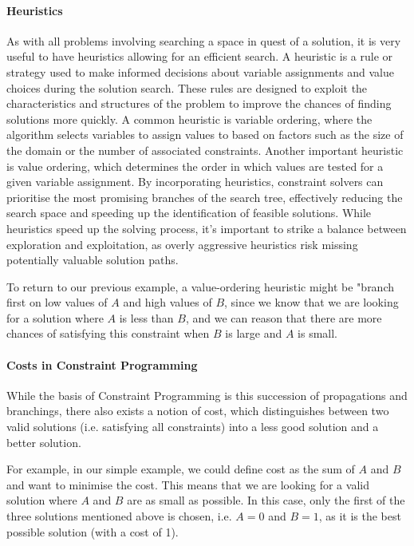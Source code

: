\paragraph{Heuristics}
As with all problems involving searching a space in quest of a solution, it is very useful to have heuristics allowing for an efficient search. A heuristic is a rule or strategy used to make informed decisions about variable assignments and value choices during the solution search. These rules are designed to exploit the characteristics and structures of the problem to improve the chances of finding solutions more quickly. A common heuristic is variable ordering, where the algorithm selects variables to assign values to based on factors such as the size of the domain or the number of associated constraints. Another important heuristic is value ordering, which determines the order in which values are tested for a given variable assignment. By incorporating heuristics, constraint solvers can prioritise the most promising branches of the search tree, effectively reducing the search space and speeding up the identification of feasible solutions. While heuristics speed up the solving process, it's important to strike a balance between exploration and exploitation, as overly aggressive heuristics risk missing potentially valuable solution paths.


To return to our previous example, a value-ordering heuristic might be "branch first on low values of $A$ and high values of $B$, since we know that we are looking for a solution where $A$ is less than $B$, and we can reason that there are more chances of satisfying this constraint when $B$ is large and $A$ is small.

\paragraph{Costs in Constraint Programming}
While the basis of Constraint Programming is this succession of propagations and branchings, there also exists a notion of cost, which distinguishes between two valid solutions (i.e. satisfying all constraints) into a less good solution and a better solution.


For example, in our simple example, we could define cost as the sum of $A$ and $B$ and want to minimise the cost. This means that we are looking for a valid solution where $A$ and $B$ are as small as possible. In this case, only the first of the three solutions mentioned above is chosen, i.e. $A=0$ and $B=1$, as it is the best possible solution (with a cost of 1).


